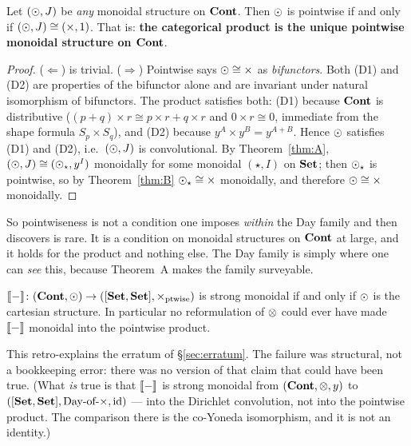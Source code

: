 \begin{Theorem}\label{thm:Bplus}
Let $(\mathbin{\odot}, J)$ be \emph{any} monoidal structure on $\mathbf{Cont}$. Then $\mathbin{\odot}$ is
pointwise if and only if $(\mathbin{\odot},J)\cong(\times,1)$. That is: \textbf{the
categorical product is the unique pointwise monoidal structure on $\mathbf{Cont}$}.
\end{Theorem}

\begin{proof}
($\Leftarrow$) is trivial. ($\Rightarrow$) Pointwise says $\mathbin{\odot}\cong\times$ as
\emph{bifunctors}. Both (D1) and (D2) are properties of the bifunctor alone and
are invariant under natural isomorphism of bifunctors. The product satisfies
both: (D1) because $\mathbf{Cont}$ is distributive ($(p+q)\times r\cong p\times r+q\times
r$ and $0\times r\cong 0$, immediate from the shape formula $S_p\times S_q$), and
(D2) because $y^A\times y^B=y^{A+B}$. Hence $\mathbin{\odot}$ satisfies (D1) and (D2),
i.e.\ $(\mathbin{\odot},J)$ is convolutional. By Theorem~\ref{thm:A},
$(\mathbin{\odot},J)\cong(\mathbin{\odot}_\star, y^I)$ monoidally for some monoidal $(\star,I)$ on
$\mathbf{Set}$; then $\mathbin{\odot}_\star$ is pointwise, so by Theorem~\ref{thm:B}
$\mathbin{\odot}_\star\cong\times$ monoidally, and therefore $\mathbin{\odot}\cong\times$ monoidally.
\end{proof}

So pointwiseness is not a condition one imposes \emph{within} the Day family and
then discovers is rare. It is a condition on monoidal structures on $\mathbf{Cont}$ at
large, and it holds for the product and nothing else. The Day family is simply
where one can \emph{see} this, because Theorem~A makes the family surveyable.

\begin{Corollary}\label{cor:deadend}
$\llbracket - \rrbracket\colon(\mathbf{Cont},\mathbin{\odot})\to([\mathbf{Set},\mathbf{Set}],\times_{\text{ptwise}})$ is strong
monoidal if and only if $\mathbin{\odot}$ is the cartesian structure. In particular no
reformulation of $\mathbin{\otimes}$ could ever have made $\llbracket - \rrbracket$ monoidal into the
pointwise product.
\end{Corollary}

This retro-explains the erratum of §\ref{sec:erratum}. The failure was
structural, not a bookkeeping error: there was no version of that claim that
could have been true. (What \emph{is} true is that $\llbracket - \rrbracket$ is strong monoidal
from $(\mathbf{Cont},\mathbin{\otimes},y)$ to $([\mathbf{Set},\mathbf{Set}],\text{Day-of-}\times,\mathrm{id})$ --- into the
Dirichlet convolution, not into the pointwise product. The comparison there is
the co-Yoneda isomorphism, and it is not an identity.)

